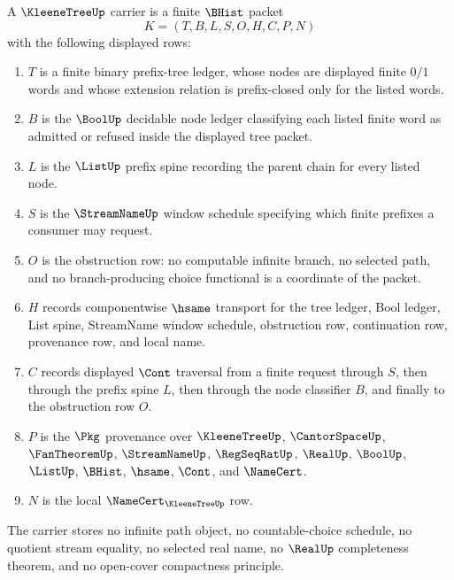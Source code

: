 \begin{definition}
\label{def:kleene-tree-carrier}
A $\KleeneTreeUp$ carrier is a finite $\BHist$ packet
$$
K=(T,B,L,S,O,H,C,P,N)
$$
with the following displayed rows:
\begin{enumerate}
\item $T$ is a finite binary prefix-tree ledger, whose nodes are displayed finite $0/1$ words and whose extension relation is prefix-closed only for the listed words.
\item $B$ is the $\BoolUp$ decidable node ledger classifying each listed finite word as admitted or refused inside the displayed tree packet.
\item $L$ is the $\ListUp$ prefix spine recording the parent chain for every listed node.
\item $S$ is the $\StreamNameUp$ window schedule specifying which finite prefixes a consumer may request.
\item $O$ is the obstruction row: no computable infinite branch, no selected path, and no branch-producing choice functional is a coordinate of the packet.
\item $H$ records componentwise $\hsame$ transport for the tree ledger, Bool ledger, List spine, StreamName window schedule, obstruction row, continuation row, provenance row, and local name.
\item $C$ records displayed $\Cont$ traversal from a finite request through $S$, then through the prefix spine $L$, then through the node classifier $B$, and finally to the obstruction row $O$.
\item $P$ is the $\Pkg$ provenance over $\KleeneTreeUp$, $\CantorSpaceUp$, $\FanTheoremUp$, $\StreamNameUp$, $\RegSeqRatUp$, $\RealUp$, $\BoolUp$, $\ListUp$, $\BHist$, $\hsame$, $\Cont$, and $\NameCert$.
\item $N$ is the local $\NameCert_{\KleeneTreeUp}$ row.
\end{enumerate}
The carrier stores no infinite path object, no countable-choice schedule, no quotient stream equality, no selected real name, no $\RealUp$ completeness theorem, and no open-cover compactness principle.
\end{definition}

